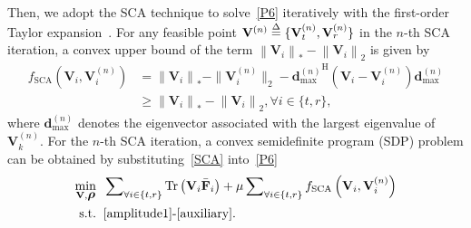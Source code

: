 \documentclass[12pt, draftclsnofoot, onecolumn]{IEEEtran}
\DeclareMathOperator{\tr}{Tr}
\newcommand{\bm}[1]{\mbox{\boldmath{$#1$}}}
\begin{document}
Then, we adopt the SCA technique to solve~\eqref{P6} iteratively with the first-order Taylor expansion~\cite{dinh2010local}. For any feasible point $\mathbf{V}^{\left(n\right)}\buildrel \Delta \over=\{\mathbf{V}^{\left(n\right)}_t,\mathbf{V}^{\left(n\right)}_r\}$ in the $n$-th SCA iteration, a convex upper bound of the term $\left\|{\mathbf{V}}_i\right\|_*-\left\|{\mathbf{V}}_i\right\|_2$ is given by 
\begin{equation}\label{SCA}
\begin{aligned}
f_{\text{SCA}}\left({\mathbf{V}}_i,\mathbf{V}^{\left(n\right)}_i\right)&=
\left\|{\mathbf{V}}_i\right\|_*-\|\mathbf{V}^{\left(n\right)}_i\|_2-{\mathbf{d}_{\text{max}}^{(n)}}^\mathrm{H}\left(\mathbf{V}_i-\mathbf{V}^{\left(n\right)}_i\right)\mathbf{d}_{\text{max}}^{(n)}\\[-0.1cm]
&\ge\left\|{\mathbf{V}}_i\right\|_*-\left\|{\mathbf{V}}_i\right\|_2, \forall i \in \{t,r\},
\end{aligned}
\end{equation}
where $\mathbf{d}_{\text{max}}^{(n)}$ denotes the eigenvector associated with the largest eigenvalue of $\mathbf{V}^{\left(n\right)}_k$.
For the $n$-th SCA iteration, a convex semidefinite program (SDP) problem can be obtained by substituting~\eqref{SCA} into~\eqref{P6}
\begin{subequations}\label{P7}
\begin{align}
\label{OBP7}\mathop {\min }\limits_{ {{\mathbf{V}},{\bm{\rho}}} } \;\;&\sum\nolimits_{ \forall i \in \{t,r\}}\tr\left({\mathbf{V}}_i\bar{\mathbf{F}}_i\right)+\mu \sum\nolimits_{ \forall i \in \{t,r\}} f_{\text{SCA}}\left({\mathbf{V}}_i,\mathbf{V}^{\left(n\right)}_i\right)\\
{\rm{s.t.}}\;\;& \eqref{amplitude1}\text{-}\eqref{auxiliary}.
\end{align}
\end{subequations}
\end{document}
